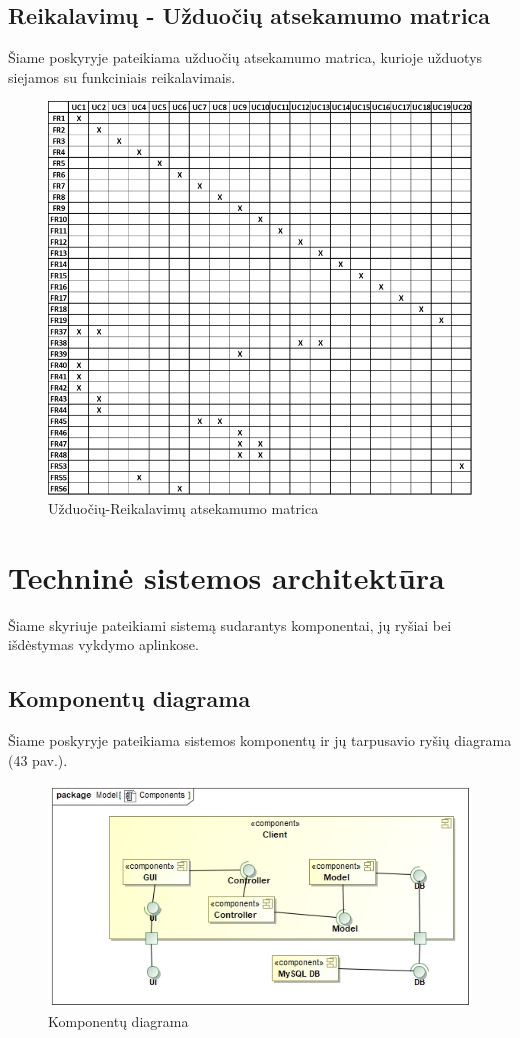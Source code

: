 \documentclass{VUMIFPSbakalaurinis}
\begin{document}
\subsection{Reikalavimų - Užduočių atsekamumo matrica}
Šiame poskyryje pateikiama užduočių atsekamumo matrica, kurioje užduotys siejamos su funkciniais reikalavimais.
\begin{figure}[H]
    \centering
    \includegraphics[scale=0.8]{img/UC-matrix}
    \caption{Užduočių-Reikalavimų atsekamumo matrica}
    \label{img:uc-matrix}
\end{figure}

\section{Techninė sistemos architektūra}
Šiame skyriuje pateikiami sistemą sudarantys komponentai, jų ryšiai bei išdėstymas vykdymo aplinkose.

\subsection{Komponentų diagrama}
Šiame poskyryje pateikiama sistemos komponentų ir jų tarpusavio ryšių diagrama (43 pav.).
\begin{figure}[h]
	\centering
	\includegraphics[scale=0.7]{img/Components}
	\caption{Komponentų diagrama}
	\label{img:components}
\end{figure}
\end{document}
